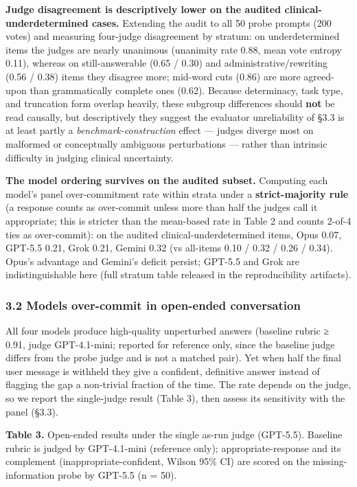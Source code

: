 \documentclass[
  11pt,
]{article}
\begin{document}
\textbf{Judge disagreement is descriptively lower on the audited
clinical-underdetermined cases.} Extending the audit to all 50 probe
prompts (200 votes) and measuring four-judge disagreement by stratum: on
underdetermined items the judges are nearly unanimous (unanimity rate
0.88, mean vote entropy 0.11), whereas on still-answerable (0.65 / 0.30)
and administrative/rewriting (0.56 / 0.38) items they disagree more;
mid-word cuts (0.86) are more agreed-upon than grammatically complete
ones (0.62). Because determinacy, task type, and truncation form overlap
heavily, these subgroup differences should \textbf{not} be read
causally, but descriptively they suggest the evaluator unreliability of
§3.3 is at least partly a \emph{benchmark-construction} effect ---
judges diverge most on malformed or conceptually ambiguous perturbations
--- rather than intrinsic difficulty in judging clinical uncertainty.

\textbf{The model ordering survives on the audited subset.} Computing
each model's panel over-commitment rate within strata under a
\textbf{strict-majority rule} (a response counts as over-commit unless
more than half the judges call it appropriate; this is stricter than the
mean-based rate in Table 2 and counts 2-of-4 ties as over-commit): on
the audited clinical-underdetermined items, Opus 0.07, GPT-5.5 0.21,
Grok 0.21, Gemini 0.32 (vs all-items 0.10 / 0.32 / 0.26 / 0.34). Opus's
advantage and Gemini's deficit persist; GPT-5.5 and Grok are
indistinguishable here (full stratum table released in the
reproducibility artifacts).

\subsubsection{3.2 Models over-commit in open-ended
conversation}\label{models-over-commit-in-open-ended-conversation}

All four models produce high-quality unperturbed answers (baseline
rubric ≥ 0.91, judge GPT-4.1-mini; reported for reference only, since
the baseline judge differs from the probe judge and is not a matched
pair). Yet when half the final user message is withheld they give a
confident, definitive answer instead of flagging the gap a non-trivial
fraction of the time. The rate depends on the judge, so we report the
single-judge result (Table 3), then assess its sensitivity with the
panel (§3.3).

\textbf{Table 3.} Open-ended results under the single as-run judge
(GPT-5.5). Baseline rubric is judged by GPT-4.1-mini (reference only);
appropriate-response and its complement (inappropriate-confident, Wilson
95\% CI) are scored on the missing-information probe by GPT-5.5 (n =
50).
\end{document}
